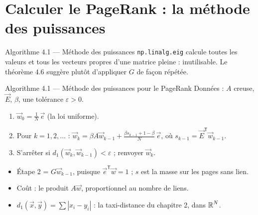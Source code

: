 \section{Calculer le PageRank : la méthode des puissances}

\begin{frame}{Algorithme 4.1 --- Méthode des puissances}
  \small \texttt{np.linalg.eig} calcule toutes les valeurs et tous les
  vecteurs propres d'une matrice pleine : inutilisable. Le théorème 4.6
  suggère plutôt d'appliquer $G$ de façon répétée.
  \begin{Algo}{Algorithme 4.1 --- Méthode des puissances pour le PageRank}
    \small Données : $A$ creuse, $\vec E$, $\beta$, une tolérance
    $\varepsilon>0$.
    \begin{enumerate}
      \item $\vec w_0=\frac1N\,\vec e$ (la loi uniforme).
      \item Pour $k=1,2,\dots$ :
        $\displaystyle \vec w_k = \beta A\vec w_{k-1}
        +\frac{\beta s_{k-1}+1-\beta}{N}\,\vec e$, où
        $s_{k-1}=\vec E^{\mathsf T}\vec w_{k-1}$.
      \item S'arrêter si $d_1(\vec w_k,\vec w_{k-1})<\varepsilon$ ; renvoyer
        $\vec w_k$.
    \end{enumerate}
  \end{Algo}
  \small
  \begin{itemize}
    \item Étape 2 = $G\vec w_{k-1}$, puisque $\vec e^{\mathsf T}\vec w=1$ ;
      $s$ est la masse sur les pages sans lien.
    \item Coût : le produit $A\vec w$, proportionnel au nombre de liens.
    \item $d_1(\vec x,\vec y)=\sum|x_i-y_i|$ : la taxi-distance du
      chapitre 2, dans $\operatorname{\mathbb{R}}^N$.
  \end{itemize}
\end{frame}

